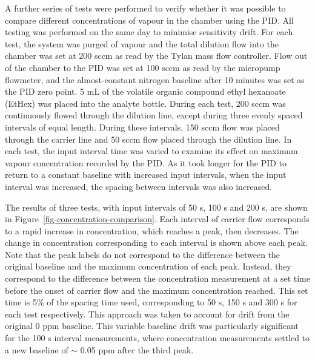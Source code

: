 \documentclass[
  a4paper,
]{scrbook}
\begin{document}
A further series of tests were performed to verify whether it was
possible to compare different concentrations of vapour in the chamber
using the PID. All testing was performed on the same day to minimise
sensitivity drift. For each test, the system was purged of vapour and
the total dilution flow into the chamber was set at 200 sccm as read by
the Tylan mass flow controller. Flow out of the chamber to the PID was
set at 100 sccm as read by the micropump flowmeter, and the
almost-constant nitrogen baseline after 10 minutes was set as the PID
zero point. 5 mL of the volatile organic compound ethyl hexanoate
(EtHex) was placed into the analyte bottle. During each test, 200 sccm
was continuously flowed through the dilution line, except during three
evenly spaced intervals of equal length. During these intervals, 150
sccm flow was placed through the carrier line and 50 sccm flow placed
through the dilution line. In each test, the input interval time was
varied to examine its effect on maximum vapour concentration recorded by
the PID. As it took longer for the PID to return to a constant baseline
with increased input intervals, when the input interval was increased,
the spacing between intervals was also increased.

The results of three tests, with input intervals of 50 s, 100 s and 200
s, are shown in Figure~\ref{fig-concentration-comparison}. Each interval
of carrier flow corresponds to a rapid increase in concentration, which
reaches a peak, then decreases. The change in concentration
corresponding to each interval is shown above each peak. Note that the
peak labels do not correspond to the difference between the original
baseline and the maximum concentration of each peak. Instead, they
correspond to the difference between the concentration measurement at a
set time before the onset of carrier flow and the maximum concentration
reached. This set time is 5\% of the spacing time used, corresponding to
50 s, 150 s and 300 s for each test respectively. This approach was
taken to account for drift from the original 0 ppm baseline. This
variable baseline drift was particularly significant for the 100 s
interval measurements, where concentration measurements settled to a new
baseline of \(\sim\) 0.05 ppm after the third peak.
\end{document}
